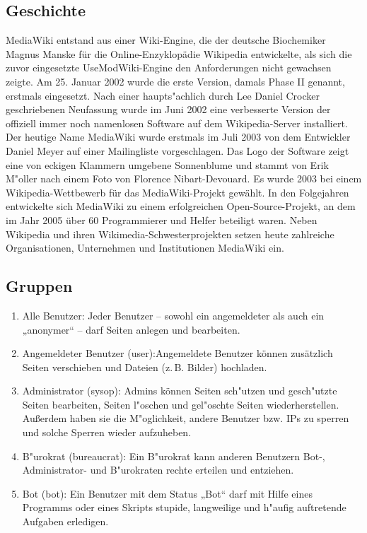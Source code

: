 \subsection{Geschichte}
MediaWiki entstand aus einer Wiki-Engine, die der deutsche Biochemiker Magnus Manske für die Online-Enzyklopädie Wikipedia entwickelte, als sich die zuvor eingesetzte UseModWiki-Engine den Anforderungen nicht gewachsen zeigte. Am 25. Januar 2002 wurde die erste Version, damals Phase II genannt, erstmals eingesetzt. Nach einer haupts"achlich durch Lee Daniel Crocker geschriebenen Neufassung wurde im Juni 2002 eine verbesserte Version der offiziell immer noch namenlosen Software auf dem Wikipedia-Server installiert. Der heutige Name MediaWiki wurde erstmals im Juli 2003 von dem Entwickler Daniel Meyer auf einer Mailingliste vorgeschlagen. Das Logo der Software zeigt eine von eckigen Klammern umgebene Sonnenblume und stammt von Erik M"oller nach einem Foto von Florence Nibart-Devouard. Es wurde 2003 bei einem Wikipedia-Wettbewerb für das MediaWiki-Projekt gewählt. In den Folgejahren entwickelte sich MediaWiki zu einem erfolgreichen Open-Source-Projekt, an dem im Jahr 2005 über 60 Programmierer und Helfer beteiligt waren. Neben Wikipedia und ihren Wikimedia-Schwesterprojekten setzen heute zahlreiche Organisationen, Unternehmen und Institutionen MediaWiki ein.
\subsection{Gruppen}
\begin{enumerate}
	\item Alle Benutzer:
	Jeder Benutzer – sowohl ein angemeldeter als auch ein „anonymer“ – darf Seiten anlegen und bearbeiten.
	\item Angemeldeter Benutzer (user):Angemeldete Benutzer können zusätzlich Seiten verschieben und Dateien (z. B. Bilder) hochladen.
	\item Administrator (sysop): Admins können Seiten sch"utzen und gesch"utzte Seiten bearbeiten, Seiten l"oschen und gel"oschte Seiten wiederherstellen. Außerdem haben sie die M"oglichkeit, andere Benutzer bzw. IPs zu sperren und solche Sperren wieder aufzuheben.
	\item B"urokrat (bureaucrat): Ein B"urokrat kann anderen Benutzern Bot-, Administrator- und B"urokraten rechte erteilen und entziehen.
	\item Bot (bot): Ein Benutzer mit dem Status „Bot“ darf mit Hilfe eines Programms oder eines Skripts stupide, langweilige und h"aufig auftretende Aufgaben erledigen.
\end{enumerate}

